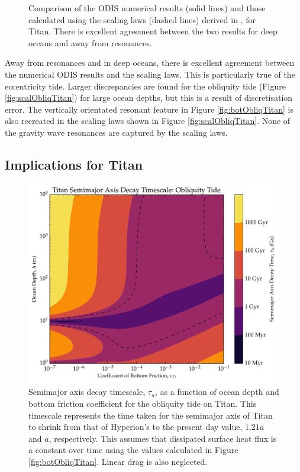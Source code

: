 \begin{figure}[!t]
\begin{subfigure}{0.4\linewidth}
\subcaption{\label{fig:scalObliqTitan}}
\end{subfigure}
\vspace*{-0.8cm}
\caption{Comparison of the ODIS numerical results (solid lines) and those calculated using the scaling laws (dashed lines) derived in \citet{chen2013tidal}, for Titan. There is excellent agreement between the two results for deep oceans and away from resonances. \label{fig:scalTitan}}
\end{figure}

Away from resonances and in deep oceans, there is excellent agreement between the numerical ODIS results and the scaling laws. This is particularly true of the eccentricity tide. Larger discrepancies are found for the obliquity tide (Figure \ref{fig:scalObliqTitan}) for large ocean depths, but this is a result of discretisation error. The vertically orientated resonant feature in Figure \ref{fig:botObliqTitan} is also recreated in the scaling laws shown in Figure \ref{fig:scalObliqTitan}. None of the gravity wave resonances are captured by the scaling laws. 

\subsection{Implications for Titan}

\begin{figure}[!t]
\centering
\includegraphics[width=0.5\linewidth]{Figures/a_decay}
\caption{Semimajor axis decay timescale, $\tau_a$, as a function of ocean depth and bottom friction coefficient for the obliquity tide on Titan. This timescale represents the time taken for the semimajor axis of Titan to shrink from that of Hyperion's to the present day value, $1.21a$ and $a$, respectively. This assumes that dissipated surface heat flux is a constant over time using the values calculated in Figure \ref{fig:botObliqTitan}. Linear drag is also neglected.   \label{fig:a_evo}}
\end{figure}

